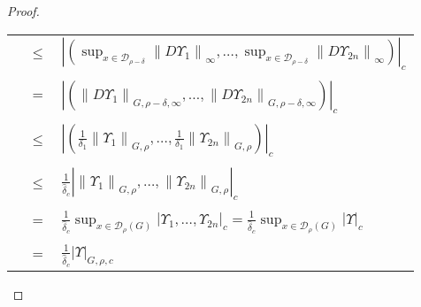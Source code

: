 \begin{proof}
\begin{longtable}{rcl}
\\
& $\leq$ & $ \left|\left(\sup_{x\in \mathcal{D}_{\rho-\delta}}\left\|D \Upsilon_1\right\|_{\infty},\ldots,\sup_{x\in \mathcal{D}_{\rho-\delta}} \left\|D \Upsilon_{2n}\right\|_{\infty}\right)\right|_c$\\
\\
& $=$ & $ \left|\left(\left\|D \Upsilon_1\right\|_{G,\rho-\delta,\infty},\ldots,\left\|D \Upsilon_{2n}\right\|_{G,\rho-\delta,\infty}\right)\right|_c$\\
\\
& $\leq$ & $ \left|\left(\frac{1}{\delta_1}\left\| \Upsilon_1\right\|_{G,\rho},\ldots,\frac{1}{\delta_1}\left\| \Upsilon_{2n}\right\|_{G,\rho}\right)\right|_c$\\
\\
& $\leq$ & $\frac{1}{\hat\delta_c}\left|\left\|\Upsilon_1\right\|_{G,\rho},\ldots,\left\|\Upsilon_{2n}\right\|_{G,\rho}\right|_c$\\
\\
& $=$ & $\frac{1}{\hat\delta_c}\sup_{x\in\mathcal{D}_\rho(G)}\left|\Upsilon_1,\ldots,\Upsilon_{2n}\right|_c = \frac{1}{\hat\delta_c}\sup_{x\in\mathcal{D}_\rho(G)}\left|\Upsilon\right|_c$\\
\\
& $=$ & $ \frac{1}{\hat\delta_c}\left|\Upsilon\right|_{G,\rho,c}$\\

\end{longtable}


\end{proof}

